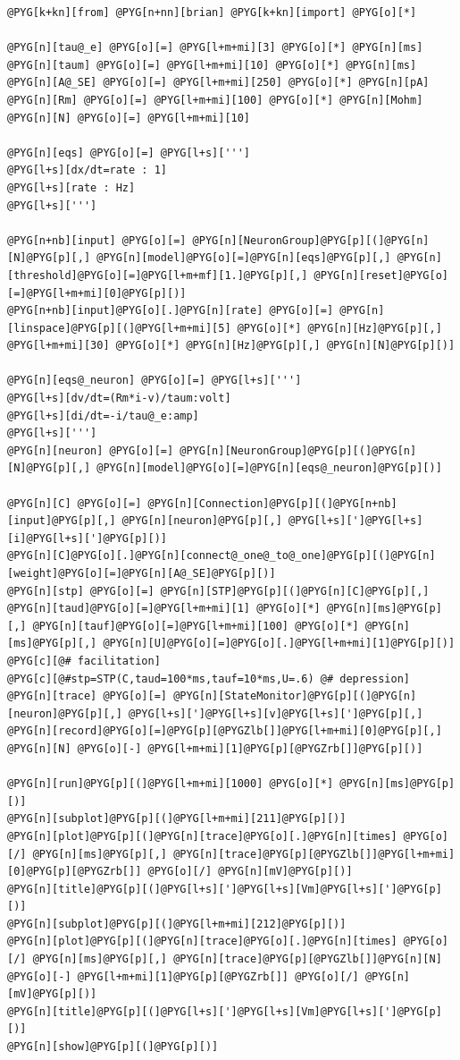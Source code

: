 \documentclass[letterpaper,10pt,english]{manual}
\begin{document}
\begin{Verbatim}[commandchars=@\[\]]
@PYG[k+kn][from] @PYG[n+nn][brian] @PYG[k+kn][import] @PYG[o][*]

@PYG[n][tau@_e] @PYG[o][=] @PYG[l+m+mi][3] @PYG[o][*] @PYG[n][ms]
@PYG[n][taum] @PYG[o][=] @PYG[l+m+mi][10] @PYG[o][*] @PYG[n][ms]
@PYG[n][A@_SE] @PYG[o][=] @PYG[l+m+mi][250] @PYG[o][*] @PYG[n][pA]
@PYG[n][Rm] @PYG[o][=] @PYG[l+m+mi][100] @PYG[o][*] @PYG[n][Mohm]
@PYG[n][N] @PYG[o][=] @PYG[l+m+mi][10]

@PYG[n][eqs] @PYG[o][=] @PYG[l+s][''']
@PYG[l+s][dx/dt=rate : 1]
@PYG[l+s][rate : Hz]
@PYG[l+s][''']

@PYG[n+nb][input] @PYG[o][=] @PYG[n][NeuronGroup]@PYG[p][(]@PYG[n][N]@PYG[p][,] @PYG[n][model]@PYG[o][=]@PYG[n][eqs]@PYG[p][,] @PYG[n][threshold]@PYG[o][=]@PYG[l+m+mf][1.]@PYG[p][,] @PYG[n][reset]@PYG[o][=]@PYG[l+m+mi][0]@PYG[p][)]
@PYG[n+nb][input]@PYG[o][.]@PYG[n][rate] @PYG[o][=] @PYG[n][linspace]@PYG[p][(]@PYG[l+m+mi][5] @PYG[o][*] @PYG[n][Hz]@PYG[p][,] @PYG[l+m+mi][30] @PYG[o][*] @PYG[n][Hz]@PYG[p][,] @PYG[n][N]@PYG[p][)]

@PYG[n][eqs@_neuron] @PYG[o][=] @PYG[l+s][''']
@PYG[l+s][dv/dt=(Rm*i-v)/taum:volt]
@PYG[l+s][di/dt=-i/tau@_e:amp]
@PYG[l+s][''']
@PYG[n][neuron] @PYG[o][=] @PYG[n][NeuronGroup]@PYG[p][(]@PYG[n][N]@PYG[p][,] @PYG[n][model]@PYG[o][=]@PYG[n][eqs@_neuron]@PYG[p][)]

@PYG[n][C] @PYG[o][=] @PYG[n][Connection]@PYG[p][(]@PYG[n+nb][input]@PYG[p][,] @PYG[n][neuron]@PYG[p][,] @PYG[l+s][']@PYG[l+s][i]@PYG[l+s][']@PYG[p][)]
@PYG[n][C]@PYG[o][.]@PYG[n][connect@_one@_to@_one]@PYG[p][(]@PYG[n][weight]@PYG[o][=]@PYG[n][A@_SE]@PYG[p][)]
@PYG[n][stp] @PYG[o][=] @PYG[n][STP]@PYG[p][(]@PYG[n][C]@PYG[p][,] @PYG[n][taud]@PYG[o][=]@PYG[l+m+mi][1] @PYG[o][*] @PYG[n][ms]@PYG[p][,] @PYG[n][tauf]@PYG[o][=]@PYG[l+m+mi][100] @PYG[o][*] @PYG[n][ms]@PYG[p][,] @PYG[n][U]@PYG[o][=]@PYG[o][.]@PYG[l+m+mi][1]@PYG[p][)] @PYG[c][@# facilitation]
@PYG[c][@#stp=STP(C,taud=100*ms,tauf=10*ms,U=.6) @# depression]
@PYG[n][trace] @PYG[o][=] @PYG[n][StateMonitor]@PYG[p][(]@PYG[n][neuron]@PYG[p][,] @PYG[l+s][']@PYG[l+s][v]@PYG[l+s][']@PYG[p][,] @PYG[n][record]@PYG[o][=]@PYG[p][@PYGZlb[]]@PYG[l+m+mi][0]@PYG[p][,] @PYG[n][N] @PYG[o][-] @PYG[l+m+mi][1]@PYG[p][@PYGZrb[]]@PYG[p][)]

@PYG[n][run]@PYG[p][(]@PYG[l+m+mi][1000] @PYG[o][*] @PYG[n][ms]@PYG[p][)]
@PYG[n][subplot]@PYG[p][(]@PYG[l+m+mi][211]@PYG[p][)]
@PYG[n][plot]@PYG[p][(]@PYG[n][trace]@PYG[o][.]@PYG[n][times] @PYG[o][/] @PYG[n][ms]@PYG[p][,] @PYG[n][trace]@PYG[p][@PYGZlb[]]@PYG[l+m+mi][0]@PYG[p][@PYGZrb[]] @PYG[o][/] @PYG[n][mV]@PYG[p][)]
@PYG[n][title]@PYG[p][(]@PYG[l+s][']@PYG[l+s][Vm]@PYG[l+s][']@PYG[p][)]
@PYG[n][subplot]@PYG[p][(]@PYG[l+m+mi][212]@PYG[p][)]
@PYG[n][plot]@PYG[p][(]@PYG[n][trace]@PYG[o][.]@PYG[n][times] @PYG[o][/] @PYG[n][ms]@PYG[p][,] @PYG[n][trace]@PYG[p][@PYGZlb[]]@PYG[n][N] @PYG[o][-] @PYG[l+m+mi][1]@PYG[p][@PYGZrb[]] @PYG[o][/] @PYG[n][mV]@PYG[p][)]
@PYG[n][title]@PYG[p][(]@PYG[l+s][']@PYG[l+s][Vm]@PYG[l+s][']@PYG[p][)]
@PYG[n][show]@PYG[p][(]@PYG[p][)]
\end{Verbatim}
\end{document}
